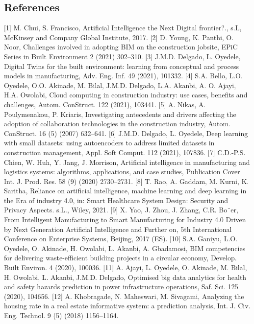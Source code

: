 \documentclass[towcolumn, 11pt]{Article}
\begin{document}
\begin{چکیده}

\section*{References}
[1] M. Chui, S. Francisco, Artificial Intelligence the Next Digital frontier?., s.L, McKinsey and Company Global Institute, 2017.
[2] D. Young, K. Panthi, O. Noor, Challenges involved in adopting BIM on the construction jobsite, EPiC Series in Built Environment 2 (2021) 302–310. 
[3] J.M.D. Delgado, L. Oyedele, Digital Twins for the built environment: learning from conceptual and process models in manufacturing, Adv. Eng. Inf. 49 (2021), 101332. 
[4] S.A. Bello, L.O. Oyedele, O.O. Akinade, M. Bilal, J.M.D. Delgado, L.A. Akanbi, A. O. Ajayi, H.A. Owolabi, Cloud computing in construction industry: use cases, benefits and challenges, Autom. ConStruct. 122 (2021), 103441. 
[5] A. Nikas, A. Poulymenakou, P. Kriaris, Investigating antecedents and drivers affecting the adoption of collaboration technologies in the construction industry, Autom. ConStruct. 16 (5) (2007) 632–641. 
[6] J.M.D. Delgado, L. Oyedele, Deep learning with small datasets: using autoencoders to address limited datasets in construction management, Appl. Soft Comput. 112 (2021), 107836. 
[7] C.D.-P.S. Chien, W. Huh, Y. Jang, J. Morrison, Artificial intelligence in manufacturing and logistics systems: algorithms, applications, and case studies, Publication Cover Int. J. Prod. Res. 58 (9) (2020) 2730–2731. 
[8] T. Rao, A. Gaddam, M. Kurni, K. Saritha, Reliance on artificial intelligence, machine learning and deep learning in the Era of industry 4.0, in: Smart Healthcare System Design: Security and Privacy Aspects. s.L., Wiley, 2021. 
[9] X. Yao, J. Zhou, J. Zhang, C.R. Bo¨er, From Intelligent Manufacturing to Smart Manufacturing for Industry 4.0 Driven by Next Generation Artificial Intelligence and Further on, 5th International Conference on Enterprise Systems, Beijing, 2017 (ES). 
[10] S.A. Ganiyu, L.O. Oyedele, O. Akinade, H. Owolabi, L. Akanbi, A. Gbadamosi, BIM competencies for delivering waste-efficient building projects in a circular economy, Develop. Built Environ. 4 (2020), 100036. 
[11] A. Ajayi, L. Oyedele, O. Akinade, M. Bilal, H. Owolabi, L. Akanbi, J.M.D. Delgado, Optimised big data analytics for health and safety hazards prediction in power infrastructure operations, Saf. Sci. 125 (2020), 104656. 
[12] A. Khobragade, N. Maheswari, M. Sivagami, Analyzing the housing rate in a real estate informative 
system: a prediction analysis, Int. J. Civ. Eng. Technol. 9 (5) (2018) 1156–1164. 

\end{چکیده}
\end{document}

